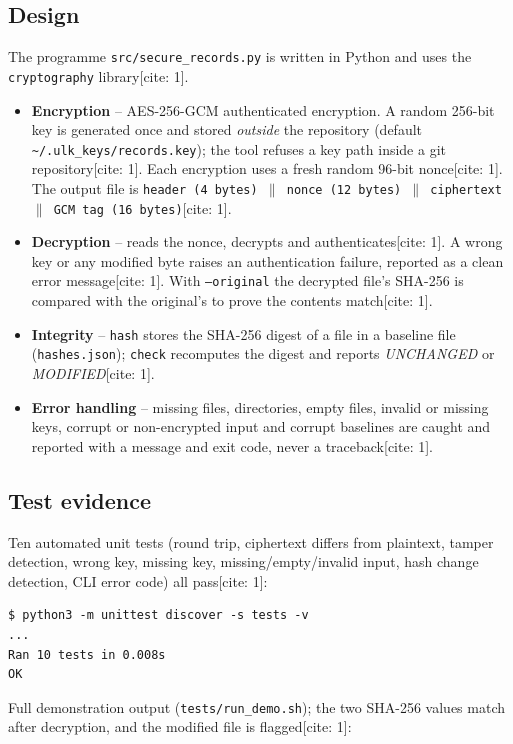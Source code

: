 \documentclass[11pt,a4paper]{article}
\begin{document}
\subsection{Design}
The programme \texttt{src/secure\_records.py} is written in Python and uses the \texttt{cryptography} library[cite: 1].
\begin{itemize}[nosep]
  \item \textbf{Encryption} -- AES-256-GCM authenticated encryption. A random 256-bit key is generated once and stored
        \emph{outside} the repository (default \texttt{\textasciitilde/.ulk\_keys/records.key}); the tool refuses a key path inside a git
        repository[cite: 1]. Each encryption uses a fresh random 96-bit nonce[cite: 1]. The output file is
        \texttt{header (4 bytes) \(\|\) nonce (12 bytes) \(\|\) ciphertext \(\|\) GCM tag (16 bytes)}[cite: 1].
  \item \textbf{Decryption} -- reads the nonce, decrypts and authenticates[cite: 1]. A wrong key or any modified byte raises an
        authentication failure, reported as a clean error message[cite: 1]. With \texttt{--original} the decrypted file's SHA-256
        is compared with the original's to prove the contents match[cite: 1].
  \item \textbf{Integrity} -- \texttt{hash} stores the SHA-256 digest of a file in a baseline file (\texttt{hashes.json});
        \texttt{check} recomputes the digest and reports \emph{UNCHANGED} or \emph{MODIFIED}[cite: 1].
  \item \textbf{Error handling} -- missing files, directories, empty files, invalid or missing keys, corrupt or non-encrypted
        input and corrupt baselines are caught and reported with a message and exit code, never a traceback[cite: 1].
\end{itemize}

\subsection{Test evidence}
Ten automated unit tests (round trip, ciphertext differs from plaintext, tamper detection, wrong key, missing key,
missing/empty/invalid input, hash change detection, CLI error code) all pass[cite: 1]:
\begin{lstlisting}
$ python3 -m unittest discover -s tests -v
...
Ran 10 tests in 0.008s
OK
\end{lstlisting}
Full demonstration output (\texttt{tests/run\_demo.sh}); the two SHA-256 values match after decryption, and the
modified file is flagged[cite: 1]:
{\footnotesize
}
\end{document}
